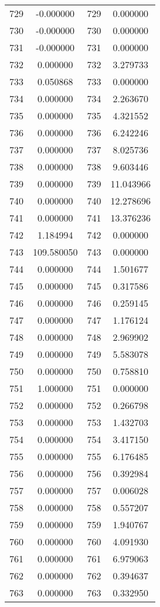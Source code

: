\documentclass[12pt]{article}
\begin{document}
\begin{longtable}{@{}cccc@{}}
729 & -0.000000 & 729 & 0.000000 \\
730 & -0.000000 & 730 & 0.000000 \\
731 & -0.000000 & 731 & 0.000000 \\
732 & 0.000000 & 732 & 3.279733 \\
733 & 0.050868 & 733 & 0.000000 \\
734 & 0.000000 & 734 & 2.263670 \\
735 & 0.000000 & 735 & 4.321552 \\
736 & 0.000000 & 736 & 6.242246 \\
737 & 0.000000 & 737 & 8.025736 \\
738 & 0.000000 & 738 & 9.603446 \\
739 & 0.000000 & 739 & 11.043966 \\
740 & 0.000000 & 740 & 12.278696 \\
741 & 0.000000 & 741 & 13.376236 \\
742 & 1.184994 & 742 & 0.000000 \\
743 & 109.580050 & 743 & 0.000000 \\
744 & 0.000000 & 744 & 1.501677 \\
745 & 0.000000 & 745 & 0.317586 \\
746 & 0.000000 & 746 & 0.259145 \\
747 & 0.000000 & 747 & 1.176124 \\
748 & 0.000000 & 748 & 2.969902 \\
749 & 0.000000 & 749 & 5.583078 \\
750 & 0.000000 & 750 & 0.758810 \\
751 & 1.000000 & 751 & 0.000000 \\
752 & 0.000000 & 752 & 0.266798 \\
753 & 0.000000 & 753 & 1.432703 \\
754 & 0.000000 & 754 & 3.417150 \\
755 & 0.000000 & 755 & 6.176485 \\
756 & 0.000000 & 756 & 0.392984 \\
757 & 0.000000 & 757 & 0.006028 \\
758 & 0.000000 & 758 & 0.557207 \\
759 & 0.000000 & 759 & 1.940767 \\
760 & 0.000000 & 760 & 4.091930 \\
761 & 0.000000 & 761 & 6.979063 \\
762 & 0.000000 & 762 & 0.394637 \\
763 & 0.000000 & 763 & 0.332950 \\

\end{longtable}
\end{document}

